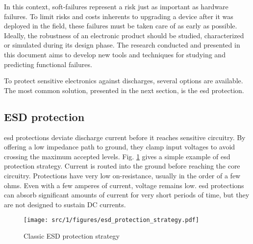In this context, soft-failures represent a risk just as important as hardware failures.
To limit risks and costs inherents to upgrading a device after it was deployed in the field, these failures must be taken care of as early as possible.
Ideally, the robustness of an electronic product should be studied, characterized or simulated during its design phase.
The research conducted and presented in this document aims to develop new tools and techniques for studying and predicting functional failures.

To protect sensitive electronics against discharges, several options are available.
The most common solution, presented in the next section, is the \gls{esd} protection.

\subsection{ESD protection}

\gls{esd} protections deviate discharge current before it reaches sensitive circuitry.
By offering a low impedance path to ground, they clamp input voltages to avoid crossing the maximum accepted levels.
Fig. \ref{fig:esd-protection-strategy} gives a simple example of \gls{esd} protection strategy.
Current is routed into the ground before reaching the core circuitry.
Protections have very low on-resistance, usually in the order of a few ohms.
Even with a few amperes of current, voltage remains low.
\gls{esd} protections can absorb significant amounts of current for very short periods of time, but they are not designed to sustain DC currents.

\begin{figure}[!h]
  \centering
  \texttt{[image: src/1/figures/esd\_protection\_strategy.pdf]}
  \caption{Classic ESD protection strategy}
  \label{fig:esd-protection-strategy}
\end{figure}

